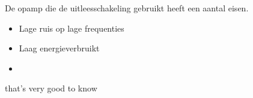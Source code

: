 De opamp die de uitleesschakeling gebruikt heeft een aantal eisen.
\begin{itemize}
    \item Lage ruis op lage frequenties
    \item Laag energieverbruikt
    \item
\end{itemize}that's very good to know